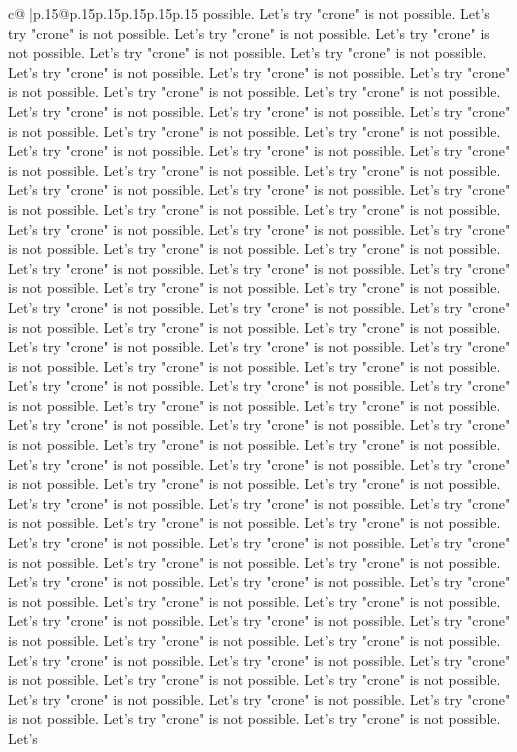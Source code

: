 \documentclass{article}
\begin{document}
{\begin{supertabular}{c@{$\;$}|p{.15\linewidth}@{}p{.15\linewidth}p{.15\linewidth}p{.15\linewidth}p{.15\linewidth}p{.15\linewidth}}
{{{possible. Let's try "crone" is not possible. Let's try "crone" is not possible. Let's try "crone" is not possible. Let's try "crone" is not possible. Let's try "crone" is not possible. Let's try "crone" is not possible. Let's try "crone" is not possible. Let's try "crone" is not possible. Let's try "crone" is not possible. Let's try "crone" is not possible. Let's try "crone" is not possible. Let's try "crone" is not possible. Let's try "crone" is not possible. Let's try "crone" is not possible. Let's try "crone" is not possible. Let's try "crone" is not possible. Let's try "crone" is not possible. Let's try "crone" is not possible. Let's try "crone" is not possible. Let's try "crone" is not possible. Let's try "crone" is not possible. Let's try "crone" is not possible. Let's try "crone" is not possible. Let's try "crone" is not possible. Let's try "crone" is not possible. Let's try "crone" is not possible. Let's try "crone" is not possible. Let's try "crone" is not possible. Let's try "crone" is not possible. Let's try "crone" is not possible. Let's try "crone" is not possible. Let's try "crone" is not possible. Let's try "crone" is not possible. Let's try "crone" is not possible. Let's try "crone" is not possible. Let's try "crone" is not possible. Let's try "crone" is not possible. Let's try "crone" is not possible. Let's try "crone" is not possible. Let's try "crone" is not possible. Let's try "crone" is not possible. Let's try "crone" is not possible. Let's try "crone" is not possible. Let's try "crone" is not possible. Let's try "crone" is not possible. Let's try "crone" is not possible. Let's try "crone" is not possible. Let's try "crone" is not possible. Let's try "crone" is not possible. Let's try "crone" is not possible. Let's try "crone" is not possible. Let's try "crone" is not possible. Let's try "crone" is not possible. Let's try "crone" is not possible. Let's try "crone" is not possible. Let's try "crone" is not possible. Let's try "crone" is not possible. Let's try "crone" is not possible. Let's try "crone" is not possible. Let's try "crone" is not possible. Let's try "crone" is not possible. Let's try "crone" is not possible. Let's try "crone" is not possible. Let's try "crone" is not possible. Let's try "crone" is not possible. Let's try "crone" is not possible. Let's try "crone" is not possible. Let's try "crone" is not possible. Let's try "crone" is not possible. Let's try "crone" is not possible. Let's try "crone" is not possible. Let's try "crone" is not possible. Let's try "crone" is not possible. Let's try "crone" is not possible. Let's try "crone" is not possible. Let's try "crone" is not possible. Let's try "crone" is not possible. Let's try "crone" is not possible. Let's try "crone" is not possible. Let's try "crone" is not possible. Let's try "crone" is not possible. Let's try "crone" is not possible. Let's try "crone" is not possible. Let's try "crone" is not possible. Let's try "crone" is not possible. Let's try "crone" is not possible. Let's try "crone" is not possible. Let's try "crone" is not possible. Let's try "crone" is not possible. Let's try "crone" is not possible. Let's try "crone" is not possible. Let's }}}
\end{supertabular}}
\end{document}
